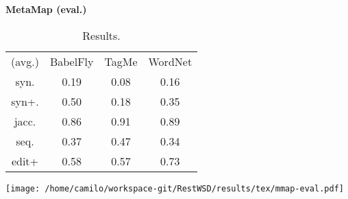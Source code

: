 \begin{center}\textbf{\Large MetaMap (eval.)}\end{center}
\begin{center}\begin{table}[p]\centering
\begin{tabular}{cccc}
(avg.) & BabelFly & TagMe & WordNet\\ 
syn. & 0.19 & 0.08 & 0.16\\ 
syn+. & 0.50 & 0.18 & 0.35\\ 
jacc. & 0.86 & 0.91 & 0.89\\ 
seq. & 0.37 & 0.47 & 0.34\\ 
edit+ & 0.58 & 0.57 & 0.73
\end{tabular}\caption{Results.}\end{table}\end{center}



\vspace{0.2cm}

\begin{center}
\texttt{[image: /home/camilo/workspace-git/RestWSD/results/tex/mmap-eval.pdf]}
\end{center}
\newpage
